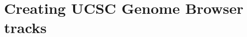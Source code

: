 \documentclass[10pt]{article}
\begin{document}







\section{Creating UCSC Genome Browser tracks}
\label{sec:browser}
\end{document}
